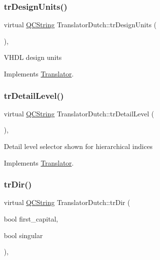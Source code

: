 \subsubsection{\texorpdfstring{trDesignUnits()}{trDesignUnits()}}
{\footnotesize\ttfamily virtual \mbox{\hyperlink{class_q_c_string}{Q\+C\+String}} Translator\+Dutch\+::tr\+Design\+Units (\begin{DoxyParamCaption}{ }\end{DoxyParamCaption})\hspace{0.3cm}{\ttfamily [inline]}, {\ttfamily [virtual]}}

V\+H\+DL design units 

Implements \mbox{\hyperlink{class_translator}{Translator}}.

\mbox{\label{class_translator_dutch_ac52d115b615423a09db774a5dcf609ae}} 
\subsubsection{\texorpdfstring{trDetailLevel()}{trDetailLevel()}}
{\footnotesize\ttfamily virtual \mbox{\hyperlink{class_q_c_string}{Q\+C\+String}} Translator\+Dutch\+::tr\+Detail\+Level (\begin{DoxyParamCaption}{ }\end{DoxyParamCaption})\hspace{0.3cm}{\ttfamily [inline]}, {\ttfamily [virtual]}}

Detail level selector shown for hierarchical indices 

Implements \mbox{\hyperlink{class_translator}{Translator}}.

\mbox{\label{class_translator_dutch_ab65f342d9a84d91f7dd3965cf0b05847}} 
\subsubsection{\texorpdfstring{trDir()}{trDir()}}
{\footnotesize\ttfamily virtual \mbox{\hyperlink{class_q_c_string}{Q\+C\+String}} Translator\+Dutch\+::tr\+Dir (\begin{DoxyParamCaption}\item[{bool}]{first\+\_\+capital,  }\item[{bool}]{singular }\end{DoxyParamCaption})\hspace{0.3cm}{\ttfamily [inline]}, {\ttfamily [virtual]}}

